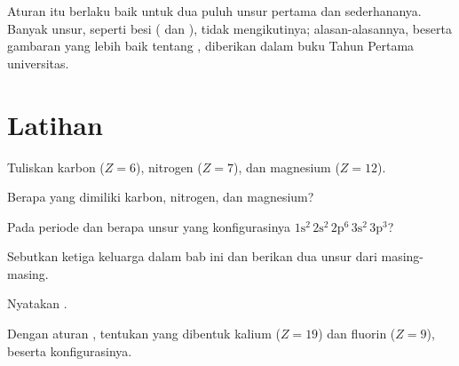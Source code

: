 \begin{remark}\label{rem:g10:electron-shells:limits}
Aturan itu berlaku baik untuk dua puluh unsur pertama dan 
sederhananya. Banyak unsur, seperti besi ( dan ),
tidak mengikutinya; alasan-alasannya, beserta gambaran yang lebih baik
tentang , diberikan dalam buku Tahun Pertama universitas.
\end{remark}

\section{Latihan}

\begin{exercise}[$\star$]\label{exo:g10:electron-shells:1}
Tuliskan  karbon ($Z = 6$), nitrogen ($Z = 7$), dan
magnesium ($Z = 12$).
\end{exercise}

\begin{exercise}[$\star$]\label{exo:g10:electron-shells:2}
Berapa  yang dimiliki karbon, nitrogen, dan magnesium?
\end{exercise}

\begin{exercise}[$\star$]\label{exo:g10:electron-shells:3}
Pada periode dan  berapa unsur yang konfigurasinya
$1\mathrm{s}^2\,2\mathrm{s}^2\,2\mathrm{p}^6\,3\mathrm{s}^2\,3\mathrm{p}^3$?
\end{exercise}

\begin{exercise}[$\star$]\label{exo:g10:electron-shells:4}
Sebutkan ketiga keluarga dalam bab ini dan berikan dua unsur dari
masing-masing.
\end{exercise}

\begin{exercise}[$\star$]\label{exo:g10:electron-shells:5}
Nyatakan .
\end{exercise}

\begin{exercise}[$\star\star$]\label{exo:g10:electron-shells:6}
Dengan aturan , tentukan  yang dibentuk kalium ($Z = 19$)
dan fluorin ($Z = 9$), beserta konfigurasinya.
\end{exercise}

